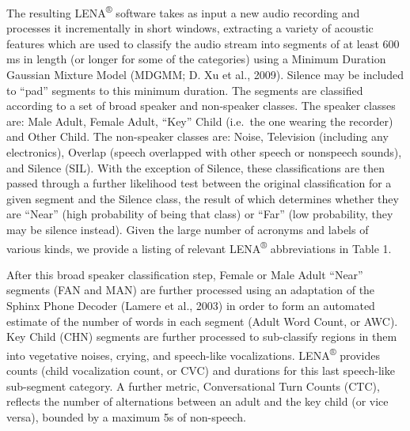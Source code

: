 \documentclass[english,floatsintext,man]{apa6}
\begin{document}
The resulting LENA\textsuperscript{®} software takes as input a new
audio recording and processes it incrementally in short windows,
extracting a variety of acoustic features which are used to classify the
audio stream into segments of at least 600 ms in length (or longer for
some of the categories) using a Minimum Duration Gaussian Mixture Model
(MDGMM; D. Xu et al., 2009). Silence may be included to \enquote{pad}
segments to this minimum duration. The segments are classified according
to a set of broad speaker and non-speaker classes. The speaker classes
are: Male Adult, Female Adult, \enquote{Key} Child (i.e.~the one wearing
the recorder) and Other Child. The non-speaker classes are: Noise,
Television (including any electronics), Overlap (speech overlapped with
other speech or nonspeech sounds), and Silence (SIL). With the exception
of Silence, these classifications are then passed through a further
likelihood test between the original classification for a given segment
and the Silence class, the result of which determines whether they are
\enquote{Near} (high probability of being that class) or \enquote{Far}
(low probability, they may be silence instead). Given the large number
of acronyms and labels of various kinds, we provide a listing of
relevant LENA\textsuperscript{®} abbreviations in Table 1.

After this broad speaker classification step, Female or Male Adult
\enquote{Near} segments (FAN and MAN) are further processed using an
adaptation of the Sphinx Phone Decoder (Lamere et al., 2003) in order to
form an automated estimate of the number of words in each segment (Adult
Word Count, or AWC). Key Child (CHN) segments are further processed to
sub-classify regions in them into vegetative noises, crying, and
speech-like vocalizations. LENA\textsuperscript{®} provides counts
(child vocalization count, or CVC) and durations for this last
speech-like sub-segment category. A further metric, Conversational Turn
Counts (CTC), reflects the number of alternations between an adult and
the key child (or vice versa), bounded by a maximum 5s of non-speech.
\end{document}
